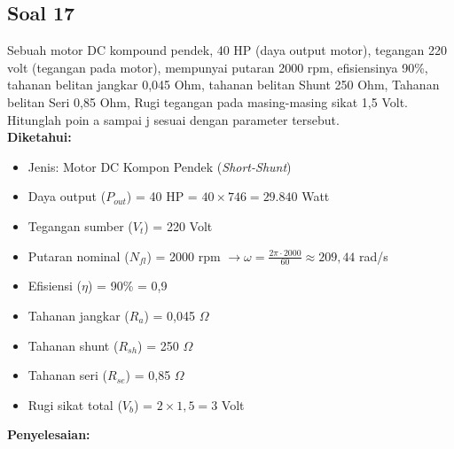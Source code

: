 \documentclass[12pt, a4paper]{article}
\begin{document}
\subsection*{Soal 17}
Sebuah motor DC kompound pendek, 40 HP (daya output motor), tegangan 220 volt (tegangan pada motor), mempunyai putaran 2000 rpm, efisiensinya 90\%, tahanan belitan jangkar 0,045 Ohm, tahanan belitan Shunt 250 Ohm, Tahanan belitan Seri 0,85 Ohm, Rugi tegangan pada masing-masing sikat 1,5 Volt.\\
Hitunglah poin a sampai j sesuai dengan parameter tersebut.\\

\textbf{Diketahui:}
\begin{itemize}
    \item Jenis: Motor DC Kompon Pendek (\textit{Short-Shunt})
    \item Daya output ($P_{out}$) = 40 HP = $40 \times 746 = 29.840$ Watt
    \item Tegangan sumber ($V_t$) = 220 Volt
    \item Putaran nominal ($N_{fl}$) = 2000 rpm $\rightarrow \omega = \frac{2\pi \cdot 2000}{60} \approx 209,44$ rad/s
    \item Efisiensi ($\eta$) = 90\% = 0,9
    \item Tahanan jangkar ($R_a$) = 0,045 $\Omega$
    \item Tahanan shunt ($R_{sh}$) = 250 $\Omega$
    \item Tahanan seri ($R_{se}$) = 0,85 $\Omega$
    \item Rugi sikat total ($V_b$) = $2 \times 1,5 = 3$ Volt
\end{itemize}

\textbf{Penyelesaian:}
\end{document}
